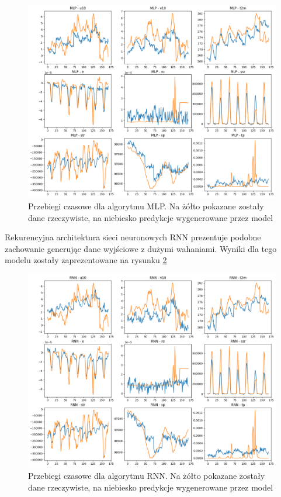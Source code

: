 \begin{figure}[H]
    \centering
    \includegraphics[width=\textwidth]{images/MLP_week.png}
    \caption{Przebiegi czasowe dla algorytmu MLP. Na żółto pokazane zostały dane 
    rzeczywiste, na niebiesko predykcje wygenerowane przez model}
    \label{mlp-week}
\end{figure}

Rekurencyjna architektura sieci neuronowych RNN prezentuje podobne zachowanie 
generując dane wyjściowe z dużymi wahaniami. Wyniki dla tego modelu zostały zaprezentowane na rysunku \ref{rnn-week}

\begin{figure}[H]
    \centering
    \includegraphics[width=\textwidth]{images/rnn_week.png}
    \caption{Przebiegi czasowe dla algorytmu RNN. Na żółto pokazane zostały dane 
    rzeczywiste, na niebiesko predykcje wygenerowane przez model}
    \label{rnn-week}
\end{figure}

